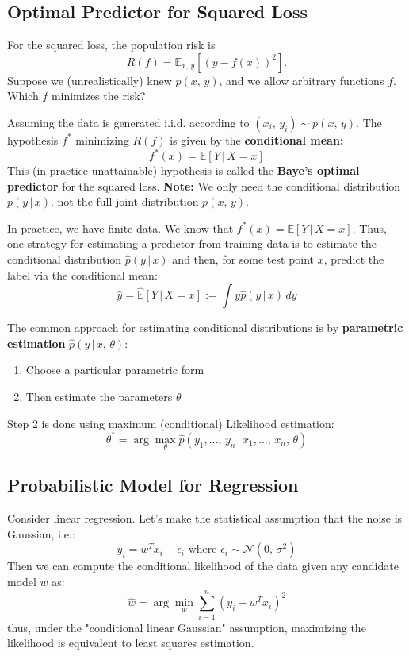\documentclass[a4paper]{extarticle}
\begin{document}
\subsection{Optimal Predictor for Squared Loss}

For the squared loss, the population risk is
\[
    R(f) = \mathbb{E}_{x, \, y}[(y - f(x))^2].
\]
Suppose we (unrealistically) knew $p(x, \, y)$, and we allow arbitrary functions $f$. Which $f$ minimizes the risk?

Assuming the data is generated i.i.d. according to $(x_i, \, y_i) \sim p(x, \, y)$. The hypothesis $f^*$ minimizing $R(f)$ is given by the \textbf{conditional mean:}
\[
    f^*(x) = \mathbb{E}[Y \, | \, X = x]
\]
This (in practice unattainable) hypothesis is called the \textbf{Baye's optimal predictor} for the squared loss.
\textbf{Note:} We only need the conditional distribution $p(y \, | \, x)$. not the full joint distribution $p(x, \, y)$.

In practice, we have finite data. We know that $f^*(x) = \mathbb{E}[Y \, | \, X = x]$. Thus, one strategy for estimating a predictor from training data is to estimate the conditional distribution $\hat{p}(y \, | \, x)$ and then, for some test point $x$, predict the label via the conditional mean:
\[
    \hat{y} = \hat{\mathbb{E}}[Y \, | \, X = x] := \int y \hat{p}(y \, | \, x) \, dy
\]

The common approach for estimating conditional distributions is by \textbf{parametric estimation} $\hat{p}(y \, | \, x, \, \theta)$:
\begin{enumerate}
    \item Choose a particular parametric form
    \item Then estimate the parameters $\theta$
\end{enumerate}
Step 2 is done using maximum (conditional) Likelihood estimation:
\[
    \theta^* = \arg \max_{\theta} \hat{p}(y_1,..., \, y_n \, | \, x_1,..., \, x_n, \, \theta)
\]

\subsection{Probabilistic Model for Regression}

Consider linear regression. Let's make the statistical assumption that the noise is Gaussian, i.e.:
\[
    y_i = w^Tx_i + \epsilon_i \text{ where } \epsilon_i \sim \mathcal{N}(0, \, \sigma^2)
\]
Then we can compute the conditional likelihood of the data given any candidate model $w$ as:
\[
    \hat{w} = \arg \min_{w} \sum_{i = 1}^n (y_i - w^Tx_i)^2
\]
thus, under the "conditional linear Gaussian" assumption, maximizing the likelihood is equivalent to least squares estimation.
\end{document}
